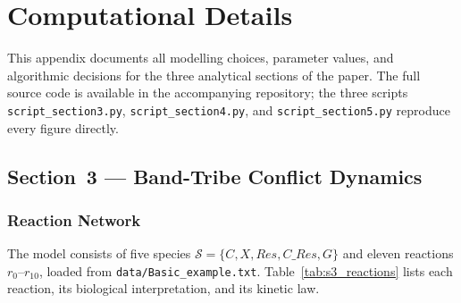 
\section{Computational Details}
\label{app:computational}

This appendix documents all modelling choices, parameter values, and
algorithmic decisions for the three analytical sections of the paper.
The full source code is available in the accompanying repository;
the three scripts \texttt{script\_section3.py}, \texttt{script\_section4.py},
and \texttt{script\_section5.py} reproduce every figure directly.

\subsection{Section~3 — Band-Tribe Conflict Dynamics}
\label{app:sec3}

\subsubsection*{Reaction Network}

The model consists of five species
$\mathcal{S} = \{C, X, \textit{Res}, C\_\textit{Res}, G\}$
and eleven reactions $r_0$--$r_{10}$, loaded from
\texttt{data/Basic\_example.txt}.  Table~\ref{tab:s3_reactions} lists
each reaction, its biological interpretation, and its kinetic law.

